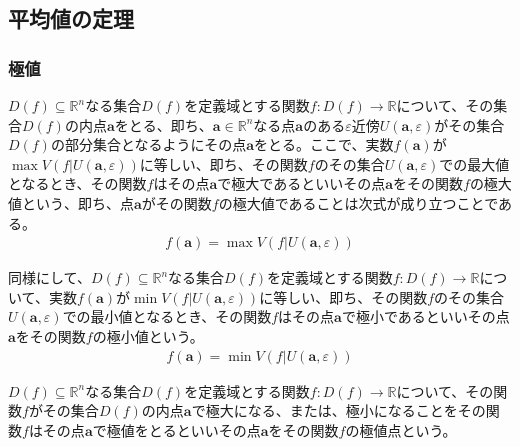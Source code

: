 \documentclass[dvipdfmx]{jsarticle}
\begin{document}
\subsection{平均値の定理}%
\subsubsection{極値}%
\begin{dfn}\label{極大値と極小値}
$D(f) \subseteq \mathbb{R}^{n}$なる集合$D(f)$を定義域とする関数$f:D(f) \rightarrow \mathbb{R}$について、その集合$D(f)$の内点$\mathbf{a}$をとる、即ち、$\mathbf{a} \in \mathbb{R}^{n}$なる点$\mathbf{a}$のある$\varepsilon$近傍$U\left( \mathbf{a},\varepsilon \right)$がその集合$D(f)$の部分集合となるようにその点$\mathbf{a}$をとる。ここで、実数$f\left( \mathbf{a} \right)$が$\max{V\left( f|U\left( \mathbf{a},\varepsilon \right) \right)}$に等しい、即ち、その関数$f$のその集合$U\left( \mathbf{a},\varepsilon \right)$での最大値となるとき、その関数$f$はその点$\mathbf{a}$で極大であるといいその点$\mathbf{a}$をその関数$f$の極大値という、即ち、点$\mathbf{a}$がその関数$f$の極大値であることは次式が成り立つことである。
\begin{align*}
f\left( \mathbf{a} \right) = \max{V\left( f|U\left( \mathbf{a},\varepsilon \right) \right)}
\end{align*}\par
同様にして、$D(f) \subseteq \mathbb{R}^{n}$なる集合$D(f)$を定義域とする関数$f:D(f) \rightarrow \mathbb{R}$について、実数$f\left( \mathbf{a} \right)$が$\min{V\left( f|U\left( \mathbf{a},\varepsilon \right) \right)}$に等しい、即ち、その関数$f$のその集合$U\left( \mathbf{a},\varepsilon \right)$での最小値となるとき、その関数$f$はその点$\mathbf{a}$で極小であるといいその点$\mathbf{a}$をその関数$f$の極小値という。
\begin{align*}
f\left( \mathbf{a} \right) = \min{V\left( f|U\left( \mathbf{a},\varepsilon \right) \right)}
\end{align*}
\end{dfn}
\begin{dfn}\label{極値}
$D(f) \subseteq \mathbb{R}^{n}$なる集合$D(f)$を定義域とする関数$f:D(f) \rightarrow \mathbb{R}$について、その関数$f$がその集合$D(f)$の内点$\mathbf{a}$で極大になる、または、極小になることをその関数$f$はその点$\mathbf{a}$で極値をとるといいその点$\mathbf{a}$をその関数$f$の極値点という。
\end{dfn}
\end{document}
